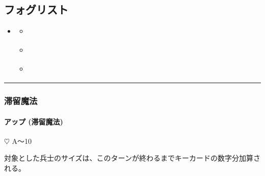 \documentclass[letterpaper,10pt,dvipdfmx]{sphinxmanual}
\begin{document}
\subsection{フォグリスト}
\label{\detokenize{auto/actionlist:foglist-act}}\label{\detokenize{auto/actionlist:id52}}
\begin{sphinxShadowBox}
\begin{itemize}
\item {} 
\sphinxAtStartPar
{}\label{\detokenize{auto/actionlist:id107}}{\hyperref[\detokenize{auto/actionlist:id54}]{}}
\begin{itemize}
\item {} 
\sphinxAtStartPar
{}\label{\detokenize{auto/actionlist:id108}}{\hyperref[\detokenize{auto/actionlist:fog-upfog}]{}}

\item {} 
\sphinxAtStartPar
{}\label{\detokenize{auto/actionlist:id109}}{\hyperref[\detokenize{auto/actionlist:fog-downfog}]{}}

\item {} 
\sphinxAtStartPar
{}\label{\detokenize{auto/actionlist:id110}}{\hyperref[\detokenize{auto/actionlist:fog-forcefog}]{}}

\end{itemize}

\end{itemize}
\end{sphinxShadowBox}


\bigskip\hrule\bigskip



\subsubsection{滞留魔法}
\label{\detokenize{auto/actionlist:id54}}

\paragraph{アップ (滞留魔法)}
\label{\detokenize{auto/actionlist:fog-upfog}}\label{\detokenize{auto/actionlist:id55}}
\sphinxAtStartPar
{} {\normalsize $\heartsuit$} A〜10

\sphinxAtStartPar
{}

\sphinxAtStartPar
対象とした兵士のサイズは、このターンが終わるまでキーカードの数字分加算される。
\end{document}
